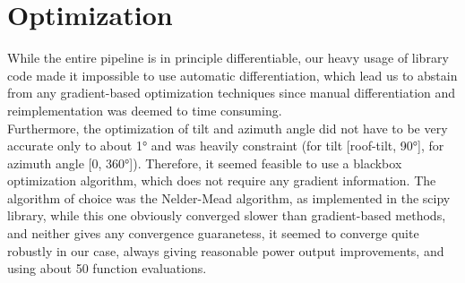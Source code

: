 \documentclass[12pt]{report}
\begin{document}
\section*{Optimization}
While the entire pipeline is in principle differentiable, our heavy usage of library code made it impossible to use automatic differentiation, which lead us to abstain from any gradient-based optimization
techniques since manual differentiation and reimplementation was deemed to time consuming. \\Furthermore, the optimization of tilt and azimuth angle did not have to be very accurate only to about 1° 
and was heavily constraint (for tilt [roof-tilt, 90°], for azimuth angle [0, 360°]). Therefore, it seemed feasible to use a blackbox optimization algorithm,
which does not require any gradient information. The algorithm of choice was the Nelder-Mead \cite{.1965} algorithm, as implemented in the scipy library, while this one obviously converged slower than
gradient-based methods, and neither gives any convergence guaranetess, it seemed to converge quite robustly in our case, always giving reasonable power output improvements,
and using about 50 function evaluations.
\end{document}
